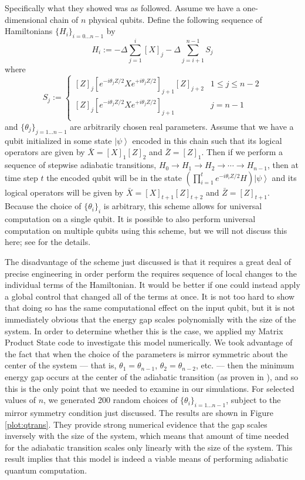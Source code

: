 \documentclass[12pt]{amsbook}
\theoremstyle{plain}
\theoremstyle{definition}
\theoremstyle{remark}
\newcommand{\ket}[1]{\left|#1\right>}
\newcommand{\paren}[1]{\left(#1\right)}
\begin{document}
Specifically what they showed was as followed.  Assume we have a one-dimensional chain of $n$ physical qubits.  Define the following sequence of Hamiltonians $\{H_i\}_{i=0\dots n-1}$ by
$$H_i := -\Delta\sum_{j=1}^{i} [X]_j - \Delta\sum_{j=i+1}^{n-1} S_j$$
where
$$S_j :=
\begin{cases}
[Z]_j\left[e^{-i\theta_jZ/2}Xe^{+i\theta_jZ/2}\right]_{j+1}[Z]_{j+2} & 1 \le j \le n-2 \\
[Z]_j\left[e^{-i\theta_jZ/2}Xe^{+i\theta_jZ/2}\right]_{j+1} & j = n-1 \\
\end{cases}
$$
and $\{\theta_j\}_{j=1\dots n-1}$ are arbitrarily chosen real parameters.  Assume that we have a qubit initialized in some state $\ket{\psi}$ encoded in this chain such that its logical operators are given by $\bar X = [X]_1[Z]_2$ and $\bar Z = [Z]_1$.  Then if we perform a sequence of stepwise adiabatic transitions, $H_0\to H_1\to H_2\to \cdots \to H_{n-1}$, then at time step $t$ the encoded qubit will be in the state $\paren{\prod_{i=1}^te^{-i\theta_iZ/2}H}\ket{\psi}$ and its logical operators will be given by $\bar X = [X]_{t+1}[Z]_{t+2}$ and $\bar Z = [Z]_{t+1}$.  Because the choice of $\{\theta_i\}_i$ is arbitrary, this scheme allows for universal computation on a single qubit.  It is possible to also perform universal computation on multiple qubits using this scheme, but we will not discuss this here;  see \cite{Bacon2009} for the details.

The disadvantage of the scheme just discussed is that it requires a great deal of precise engineering in order perform the requires sequence of local changes to the individual terms of the Hamiltonian.  It would be better if one could instead apply a global control that changed all of the terms at once.  It is not too hard to show that doing so has the same computational effect on the input qubit\cite{TheFuture}, but it is not immediately obvious that the energy gap scales polynomially with the size of the system.  In order to determine whether this is the case, we applied my Matrix Product State code to investigate this model numerically.  We took advantage of the fact that when the choice of the parameters is mirror symmetric about the center of the system --- that is, $\theta_1 = \theta_{n-1}$, $\theta_2=\theta_{n-2}$, etc. --- then the minimum energy gap occurs at the center of the adiabatic transition (as proven in \cite{TheFuture}), and so this is the only point that we needed to examine in our simulations.  For selected values of $n$, we generated 200 random choices of $\{\theta_i\}_{i=1\dots n-1}$, subject to the mirror symmetry condition just discussed.  The results are shown in Figure \ref{plot:qtrans}.  They provide strong numerical evidence that the gap scales inversely with the size of the system, which means that amount of time needed for the adiabatic transition scales only linearly with the size of the system.  This result implies that this model is indeed a viable means of performing adiabatic quantum computation.
\end{document}
